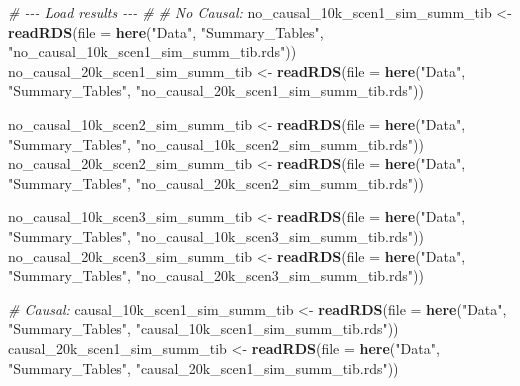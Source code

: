 \documentclass[
]{article}
\newenvironment{Shaded}{\begin{snugshade}}{\end{snugshade}}
\newcommand{\AttributeTok}[1]{\textcolor[rgb]{0.13,0.29,0.53}{#1}}
\newcommand{\CommentTok}[1]{\textcolor[rgb]{0.56,0.35,0.01}{\textit{#1}}}
\newcommand{\FunctionTok}[1]{\textcolor[rgb]{0.13,0.29,0.53}{\textbf{#1}}}
\newcommand{\NormalTok}[1]{#1}
\newcommand{\OtherTok}[1]{\textcolor[rgb]{0.56,0.35,0.01}{#1}}
\newcommand{\StringTok}[1]{\textcolor[rgb]{0.31,0.60,0.02}{#1}}
\begin{document}
\begin{Shaded}
\begin{Highlighting}[]
\CommentTok{\# {-}{-}{-} Load results {-}{-}{-} \#}
\CommentTok{\# No Causal:}
\NormalTok{no\_causal\_10k\_scen1\_sim\_summ\_tib }\OtherTok{\textless{}{-}} \FunctionTok{readRDS}\NormalTok{(}\AttributeTok{file =} \FunctionTok{here}\NormalTok{(}\StringTok{"Data"}\NormalTok{, }\StringTok{"Summary\_Tables"}\NormalTok{, }\StringTok{"no\_causal\_10k\_scen1\_sim\_summ\_tib.rds"}\NormalTok{))}
\NormalTok{no\_causal\_20k\_scen1\_sim\_summ\_tib }\OtherTok{\textless{}{-}} \FunctionTok{readRDS}\NormalTok{(}\AttributeTok{file =} \FunctionTok{here}\NormalTok{(}\StringTok{"Data"}\NormalTok{, }\StringTok{"Summary\_Tables"}\NormalTok{, }\StringTok{"no\_causal\_20k\_scen1\_sim\_summ\_tib.rds"}\NormalTok{))}

\NormalTok{no\_causal\_10k\_scen2\_sim\_summ\_tib }\OtherTok{\textless{}{-}} \FunctionTok{readRDS}\NormalTok{(}\AttributeTok{file =} \FunctionTok{here}\NormalTok{(}\StringTok{"Data"}\NormalTok{, }\StringTok{"Summary\_Tables"}\NormalTok{, }\StringTok{"no\_causal\_10k\_scen2\_sim\_summ\_tib.rds"}\NormalTok{))}
\NormalTok{no\_causal\_20k\_scen2\_sim\_summ\_tib }\OtherTok{\textless{}{-}} \FunctionTok{readRDS}\NormalTok{(}\AttributeTok{file =} \FunctionTok{here}\NormalTok{(}\StringTok{"Data"}\NormalTok{, }\StringTok{"Summary\_Tables"}\NormalTok{, }\StringTok{"no\_causal\_20k\_scen2\_sim\_summ\_tib.rds"}\NormalTok{))}

\NormalTok{no\_causal\_10k\_scen3\_sim\_summ\_tib }\OtherTok{\textless{}{-}} \FunctionTok{readRDS}\NormalTok{(}\AttributeTok{file =} \FunctionTok{here}\NormalTok{(}\StringTok{"Data"}\NormalTok{, }\StringTok{"Summary\_Tables"}\NormalTok{, }\StringTok{"no\_causal\_10k\_scen3\_sim\_summ\_tib.rds"}\NormalTok{))}
\NormalTok{no\_causal\_20k\_scen3\_sim\_summ\_tib }\OtherTok{\textless{}{-}} \FunctionTok{readRDS}\NormalTok{(}\AttributeTok{file =} \FunctionTok{here}\NormalTok{(}\StringTok{"Data"}\NormalTok{, }\StringTok{"Summary\_Tables"}\NormalTok{, }\StringTok{"no\_causal\_20k\_scen3\_sim\_summ\_tib.rds"}\NormalTok{))}


\CommentTok{\# Causal:}
\NormalTok{causal\_10k\_scen1\_sim\_summ\_tib }\OtherTok{\textless{}{-}} \FunctionTok{readRDS}\NormalTok{(}\AttributeTok{file =} \FunctionTok{here}\NormalTok{(}\StringTok{"Data"}\NormalTok{, }\StringTok{"Summary\_Tables"}\NormalTok{, }\StringTok{"causal\_10k\_scen1\_sim\_summ\_tib.rds"}\NormalTok{))}
\NormalTok{causal\_20k\_scen1\_sim\_summ\_tib }\OtherTok{\textless{}{-}} \FunctionTok{readRDS}\NormalTok{(}\AttributeTok{file =} \FunctionTok{here}\NormalTok{(}\StringTok{"Data"}\NormalTok{, }\StringTok{"Summary\_Tables"}\NormalTok{, }\StringTok{"causal\_20k\_scen1\_sim\_summ\_tib.rds"}\NormalTok{))}


\end{Highlighting}
\end{Shaded}
\end{document}

